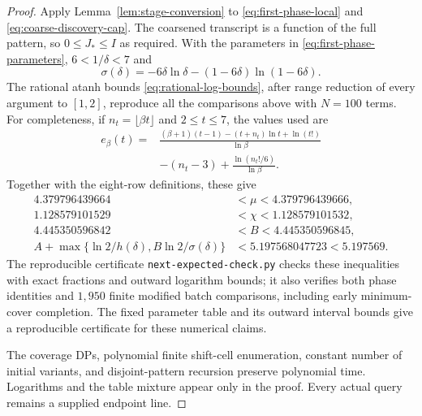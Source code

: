 \begin{proof}
Apply Lemma~\ref{lem:stage-conversion} to
\eqref{eq:first-phase-local} and
\eqref{eq:coarse-discovery-cap}. The coarsened transcript is a
function of the full pattern, so $0\le J_*\le I$ as required.
With the parameters in \eqref{eq:first-phase-parameters},
$6<1/\delta<7$ and
\[
 \sigma(\delta)=-6\delta\ln\delta
               -(1-6\delta)\ln(1-6\delta).
\]
The rational atanh bounds \eqref{eq:rational-log-bounds}, after
range reduction of every argument to $[1,2]$, reproduce all the
comparisons above with $N=100$ terms. For completeness, if
$n_t=\lfloor\beta t\rfloor$ and $2\le t\le7$, the values used are
\[
 \begin{aligned}
 e_\beta(t)={}&
 \frac{(\beta+1)(t-1)-(t+n_t)\ln t+\ln(t!)}{\ln\beta}\\
 &-(n_t-3)+\frac{\ln(n_t!/6)}{\ln\beta}.
 \end{aligned}
\]
Together with the eight-row definitions, these give
\[
 \begin{aligned}
 4.379796439664&<\mu<4.379796439666,\\
 1.128579101529&<\chi<1.128579101532,\\
 4.445350596842&<B<4.445350596845,\\
 A+\max\{\ln2/h(\delta),B\ln2/\sigma(\delta)\}
 &<5.197568047723<5.197569.
 \end{aligned}
\]
The reproducible certificate \texttt{next-expected-check.py} checks
these inequalities with exact fractions and outward logarithm bounds;
it also verifies both phase identities and $1{,}950$ finite modified
batch comparisons, including early minimum-cover completion.
The fixed parameter table and its outward interval bounds give a
reproducible certificate for these numerical claims.

The coverage DPs, polynomial finite shift-cell enumeration, constant
number of initial variants, and disjoint-pattern recursion preserve
polynomial time. Logarithms and the table mixture appear only in the
proof. Every actual query remains a supplied endpoint line.
\end{proof}
